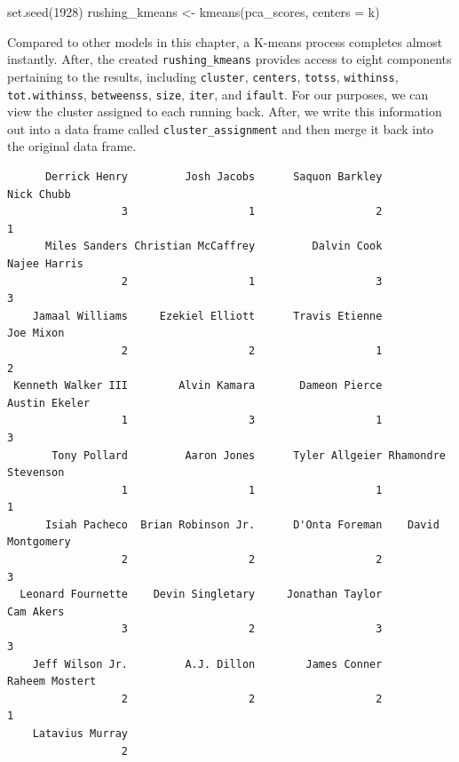 \documentclass[
  letterpaper,
]{krantz}
\newenvironment{Shaded}{\begin{snugshade}}{\end{snugshade}}
\newcommand{\AttributeTok}[1]{\textcolor[rgb]{0.40,0.45,0.13}{#1}}
\newcommand{\DecValTok}[1]{\textcolor[rgb]{0.68,0.00,0.00}{#1}}
\newcommand{\FunctionTok}[1]{\textcolor[rgb]{0.28,0.35,0.67}{#1}}
\newcommand{\NormalTok}[1]{\textcolor[rgb]{0.00,0.23,0.31}{#1}}
\newcommand{\OtherTok}[1]{\textcolor[rgb]{0.00,0.23,0.31}{#1}}
\newcommand{\SpecialCharTok}[1]{\textcolor[rgb]{0.37,0.37,0.37}{#1}}
\begin{document}
\begin{Shaded}
\begin{Highlighting}[]
\FunctionTok{set.seed}\NormalTok{(}\DecValTok{1928}\NormalTok{)}
\NormalTok{rushing\_kmeans }\OtherTok{\textless{}{-}} \FunctionTok{kmeans}\NormalTok{(pca\_scores, }\AttributeTok{centers =}\NormalTok{ k)}
\end{Highlighting}
\end{Shaded}

Compared to other models in this chapter, a K-means process completes
almost instantly. After, the created \texttt{rushing\_kmeans} provides
access to eight components pertaining to the results, including
\texttt{cluster}, \texttt{centers}, \texttt{totss}, \texttt{withinss},
\texttt{tot.withinss}, \texttt{betweenss}, \texttt{size}, \texttt{iter},
and \texttt{ifault}. For our purposes, we can view the cluster assigned
to each running back. After, we write this information out into a data
frame called \texttt{cluster\_assignment} and then merge it back into
the original data frame.

\begin{Shaded}
\end{Shaded}

\begin{verbatim}
      Derrick Henry         Josh Jacobs      Saquon Barkley          Nick Chubb 
                  3                   1                   2                   1 
      Miles Sanders Christian McCaffrey         Dalvin Cook        Najee Harris 
                  2                   1                   3                   3 
    Jamaal Williams     Ezekiel Elliott      Travis Etienne           Joe Mixon 
                  2                   2                   1                   2 
 Kenneth Walker III        Alvin Kamara       Dameon Pierce       Austin Ekeler 
                  1                   3                   1                   3 
       Tony Pollard         Aaron Jones      Tyler Allgeier Rhamondre Stevenson 
                  1                   1                   1                   1 
      Isiah Pacheco  Brian Robinson Jr.      D'Onta Foreman    David Montgomery 
                  2                   2                   2                   3 
  Leonard Fournette    Devin Singletary     Jonathan Taylor           Cam Akers 
                  3                   2                   3                   3 
    Jeff Wilson Jr.         A.J. Dillon        James Conner      Raheem Mostert 
                  2                   2                   2                   1 
    Latavius Murray 
                  2 
\end{verbatim}
\end{document}
